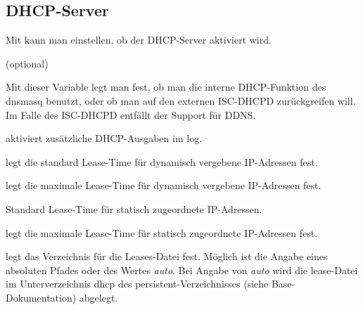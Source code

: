 


\subsection{DHCP-Server}

  \begin{description}


    {Mit  kann man einstellen, ob der DHCP-Server aktiviert wird.}

     (optional)
    
    {Mit dieser Variable legt man fest, ob man die interne DHCP-Funktion des
    dnsmasq benutzt, oder ob man auf den externen ISC-DHCPD zurückgreifen will.
    Im Falle des ISC-DHCPD entfällt der Support für DDNS.}

    
    {aktiviert zusätzliche DHCP-Ausgaben im log.}


    {legt die standard Lease-Time für dynamisch vergebene IP-Adressen fest.}


    {legt die maximale Lease-Time für dynamisch vergebene IP-Adressen fest.}


    {Standard Lease-Time für statisch zugeordnete IP-Adressen.}


    {legt die maximale Lease-Time für statisch zugeordnete IP-Adressen fest.}


    {legt das Verzeichnis für die Leases-Datei fest. 
    Möglich ist die Angabe eines absoluten Pfades oder des Wertes \emph{auto}. 
    Bei Angabe von \emph{auto} wird die lease-Datei im Unterverzeichnis dhcp des 
    persistent-Verzeichnisses (siehe Base-Dokumentation) abgelegt.}



\end{description}
